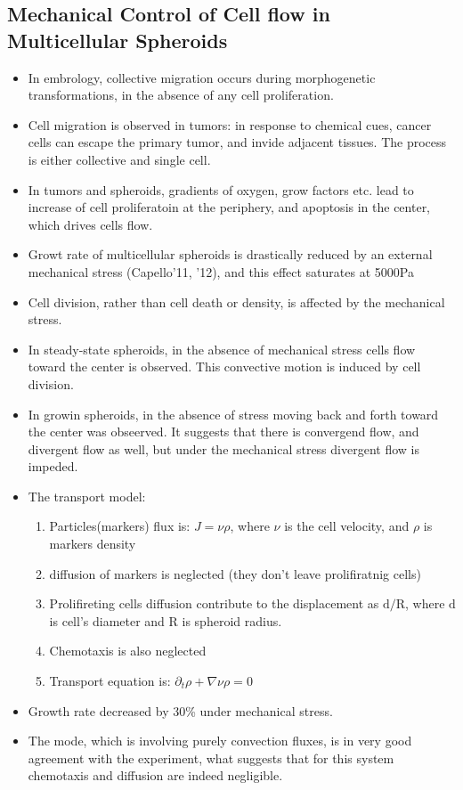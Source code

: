 \documentclass[10pt,a4paper]{article}
\begin{document}
\subsection{Mechanical Control of Cell flow in Multicellular Spheroids \cite{dm:13}}
\begin{itemize}
 \item In embrology, collective migration occurs during morphogenetic transformations, in the absence of any cell proliferation.
 \item Cell migration is observed in tumors: in response to chemical cues, cancer cells can escape the primary tumor, and invide adjacent tissues. 
 The process is either collective and single cell.
 \item In tumors and spheroids, gradients of oxygen, grow factors etc. lead to increase of cell proliferatoin at the periphery, and apoptosis in the center, which drives cells flow.
 \item Growt rate of multicellular spheroids is drastically reduced by an external mechanical stress (Capello'11, '12), and this effect saturates at 5000Pa
 \item Cell division, rather than cell death or density, is affected by the mechanical stress.
 \item In steady-state spheroids, in the absence of mechanical stress cells flow toward the center is observed. 
 This convective motion is induced by cell division. 
 \item In growin spheroids, in the absence of stress moving back and forth toward the center was obseerved.
 It suggests that there is convergend flow, and divergent flow as well, but under the mechanical stress divergent flow is impeded. 
 \item The transport model:
 \begin{enumerate}
  \item Particles(markers) flux is: $J = \nu \rho$, where $\nu $ is the cell velocity, and $\rho $ is markers density
  \item diffusion of markers is neglected (they don't leave prolifiratnig cells)
  \item Prolifireting cells diffusion contribute to the displacement as $\mathrm{d}/\mathrm{R}$, 
  where $\mathrm{d}$ is cell's diameter and $\mathrm{R}$ is spheroid radius.
  \item Chemotaxis is also neglected
  \item Transport equation is: $\partial_t \rho + \nabla \nu \rho = 0$
 \end{enumerate}
 \item Growth rate decreased by 30\% under mechanical stress.
 \item The mode, which is involving purely convection fluxes, is in very good agreement with the experiment, 
 what suggests that for this system chemotaxis and diffusion are indeed negligible.
\end{itemize}
\end{document}
